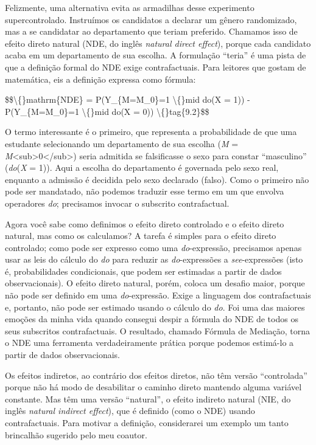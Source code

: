 \documentclass[11pt,a5paper,twoside]{book}
\begin{document}
Felizmente, uma alternativa evita as armadilhas desse experimento supercontrolado. Instruímos os candidatos a declarar um gênero randomizado, mas a se candidatar ao departamento que teriam preferido. Chamamos isso de efeito direto natural (NDE, do inglês \textit{natural direct effect}), porque cada candidato acaba em um departamento de sua escolha. A formulação “teria” é uma pista de que a definição formal do NDE exige contrafactuais. Para leitores que gostam de matemática, eis a definição expressa como fórmula:

\$\$\textbackslash\{\}mathrm\{NDE\} = P(Y\_\{M=M\_0\}=1 \textbackslash\{\}mid do(X = 1)) - P(Y\_\{M=M\_0\}=1 \textbackslash\{\}mid do(X = 0)) \textbackslash\{\}tag\{9.2\}\$\$

O termo interessante é o primeiro, que representa a probabilidade de que uma estudante selecionando um departamento de sua escolha (\textit{M} = \textit{M}<sub>0</sub>) seria admitida se falsificasse o sexo para constar “masculino” (\textit{do}(\textit{X} = 1)). Aqui a escolha do departamento é governada pelo sexo real, enquanto a admissão é decidida pelo sexo declarado (falso). Como o primeiro não pode ser mandatado, não podemos traduzir esse termo em um que envolva operadores \textit{do}; precisamos invocar o subscrito contrafactual.

Agora você sabe como definimos o efeito direto controlado e o efeito direto natural, mas como os calculamos? A tarefa é simples para o efeito direto controlado; como pode ser expresso como uma \textit{do}-expressão, precisamos apenas usar as leis do cálculo do \textit{do} para reduzir as \textit{do}-expressões a \textit{see}-expressões (isto é, probabilidades condicionais, que podem ser estimadas a partir de dados observacionais). O efeito direto natural, porém, coloca um desafio maior, porque não pode ser definido em uma \textit{do}-expressão. Exige a linguagem dos contrafactuais e, portanto, não pode ser estimado usando o cálculo do \textit{do}. Foi uma das maiores emoções da minha vida quando consegui despir a fórmula do NDE de todos os seus subscritos contrafactuais. O resultado, chamado Fórmula de Mediação, torna o NDE uma ferramenta verdadeiramente prática porque podemos estimá-lo a partir de dados observacionais.

Os efeitos indiretos, ao contrário dos efeitos diretos, não têm versão “controlada” porque não há modo de desabilitar o caminho direto mantendo alguma variável constante. Mas têm uma versão “natural”, o efeito indireto natural (NIE, do inglês \textit{natural indirect effect}), que é definido (como o NDE) usando contrafactuais. Para motivar a definição, considerarei um exemplo um tanto brincalhão sugerido pelo meu coautor.
\end{document}
